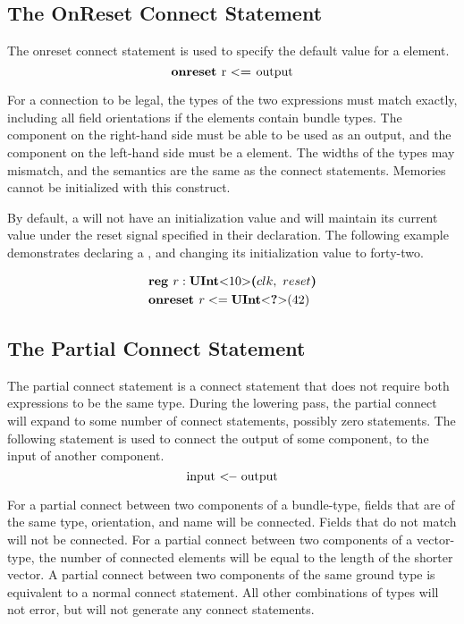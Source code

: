 \documentclass[12pt]{article}
\begin{document}
\subsection{The OnReset Connect Statement}
The onreset connect statement is used to specify the default value for a  element.
\[
\text{\bf onreset\ } \text{r } \text{\bf $<$=\ } \text{output} 
\]

For a connection to be legal, the types of the two expressions must match exactly, including all field orientations if the elements contain bundle types.
The component on the right-hand side must be able to be used as an output, and the component on the left-hand side must be a  element.
The widths of the types may mismatch, and the semantics are the same as the connect statements.
Memories cannot be initialized with this construct.

By default, a  will not have an initialization value and will maintain its current value under the reset signal specified in their declaration.
The following example demonstrates declaring a , and changing its initialization value to forty-two.

\[
\begin{aligned}
& \kw{reg} r : \kws{UInt}\kws{$<$} 10 \kws{$>$} \kws{(} clk, \ reset \kws{)}\\
& \kw{onreset} r <= \kws{UInt}\kws{$<$} \kws{?} \kws{$>$}(42)
\end{aligned}
\]

\subsection{The Partial Connect Statement}
The partial connect statement is a connect statement that does not require both expressions to be the same type. 
During the lowering pass, the partial connect will expand to some number of connect statements, possibly zero statements.
The following statement is used to connect the output of some component, to the input of another component. 
\[
\text{input } \text{\bf $<$--\ } \text{output} 
\]

For a partial connect between two components of a bundle-type, fields that are of the same type, orientation, and name will be connected.
Fields that do not match will not be connected.
For a partial connect between two components of a vector-type, the number of connected elements will be equal to the length of the shorter vector.
A partial connect between two components of the same ground type is equivalent to a normal connect statement.
All other combinations of types will not error, but will not generate any connect statements.
\end{document}
